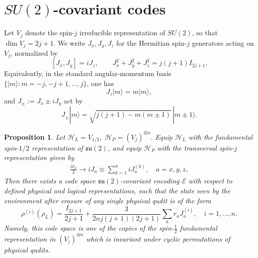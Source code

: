 \documentclass[11pt,letterpaper]{article}
\theoremstyle{plain}
\theoremstyle{plain}
\theoremstyle{plain}
\theoremstyle{plain}
\theoremstyle{plain}
\theoremstyle{plain}
\theoremstyle{plain}
\newtheorem{smproposition}[smtheorem]{Proposition}
\theoremstyle{definition}
\theoremstyle{plain}
\begin{document}
\section{\texorpdfstring{$SU(2)$}{SU(2)}-covariant codes}\label{sec:supple_su2}

Let \(V_j\) denote the spin-\(j\) irreducible representation of \(SU(2)\), so that
$
    \dim V_j=2j+1.
$
We write \(J_x,J_y,J_z\) for the Hermitian spin-\(j\) generators acting on \(V_j\), normalized by
\begin{equation}\label{eq:spinj}
    [J_x,J_y]=iJ_z,
    \qquad
    J_x^2+J_y^2+J_z^2=j(j+1)I_{2j+1}.
\end{equation}
Equivalently, in the standard angular-momentum basis
\(\{|m\rangle:m=-j,-j+1,\ldots,j\}\), one has
\begin{equation}\label{eq:Jz}
    J_z|m\rangle=m|m\rangle,
\end{equation}
and \(J_\pm:=J_x\pm iJ_y\) act by
\begin{equation}\label{eq:Jpm}
    J_\pm |m\rangle
    =
    \sqrt{j(j+1)-m(m\pm1)}\,|m\pm1\rangle .
\end{equation}

\begin{smproposition}\label{prop:SU2cov}
    Let
    $
        \mathcal H_L=V_{1/2},\;
        \mathcal H_P=(V_j)^{\otimes n}.
    $
    Equip \(\mathcal H_L\) with the fundamental spin-\(1/2\) representation of
    \(\mathfrak{su}(2)\), and equip \(\mathcal H_P\) with the transversal spin-\(j\)
    representation given by
    \begin{equation}
    \begin{gathered}
    \frac{i \sigma_a}{2} \rightarrow i J_a \equiv \sum_{k=1}^n i J_a^{(k)}, \quad a=x, y, z,
    \end{gathered}
    \end{equation} 
    Then there exists a code space $\mathfrak{su}(2)$-covariant encoding $\mathcal{E}$ with respect to defined physical and logical representations,
    such that the state seen by the environment after erasure of any single physical qudit is of the form
    \begin{equation}\label{eq:reducedStateSU2}
        \rho^{(i)}\left(\rho_L\right)=\frac{I_{2 j+1}}{2 j+1}+\frac{3}{2 n j(j+1)(2 j+1)} \sum_a r_a J_a^{(i)}, \quad i=1, \ldots, n.
    \end{equation}
    Namely, this code space is one of the copies of the spin-$\frac{1}{2}$ fundamental representation in $\left(V_j\right)^{\otimes n}$ which is invariant under cyclic permutations of physical qudits.
    
\end{smproposition}     
\end{document}
